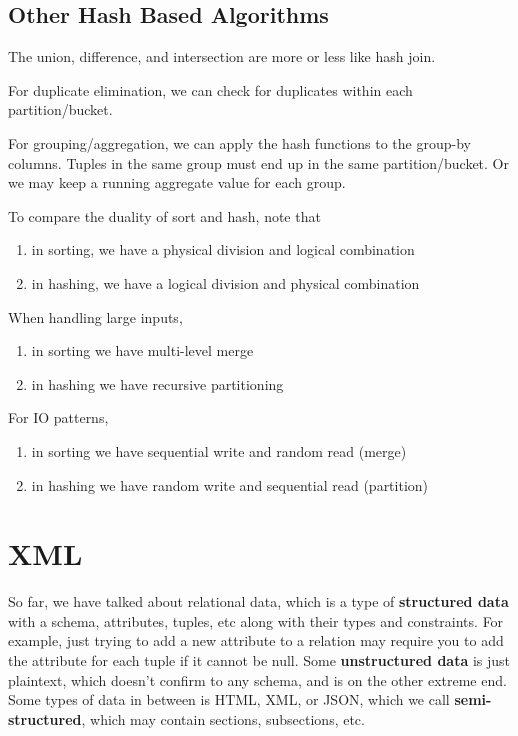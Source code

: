 \documentclass{article}
\begin{document}
  \subsection{Other Hash Based Algorithms}

    The union, difference, and intersection are more or less like hash join. 

    For duplicate elimination, we can check for duplicates within each partition/bucket. 

    For grouping/aggregation, we can apply the hash functions to the group-by columns. Tuples in the same group must end up in the same partition/bucket. Or we may keep a running aggregate value for each group. 

    To compare the duality of sort and hash, note that 
    \begin{enumerate}
      \item in sorting, we have a physical division and logical combination 
      \item in hashing, we have a logical division and physical combination
    \end{enumerate}
    When handling large inputs, 
    \begin{enumerate}
      \item in sorting we have multi-level merge 
      \item in hashing we have recursive partitioning 
    \end{enumerate}
    For IO patterns, 
    \begin{enumerate}
      \item in sorting we have sequential write and random read (merge) 
      \item in hashing we have random write and sequential read (partition) 
    \end{enumerate}

\section{XML} 

  So far, we have talked about relational data, which is a type of \textbf{structured data} with a schema, attributes, tuples, etc along with their types and constraints. For example, just trying to add a new attribute to a relation may require you to add the attribute for each tuple if it cannot be null. Some \textbf{unstructured data} is just plaintext, which doesn't confirm to any schema, and is on the other extreme end. Some types of data in between is HTML, XML, or JSON, which we call \textbf{semi-structured}, which may contain sections, subsections, etc. 
\end{document}
